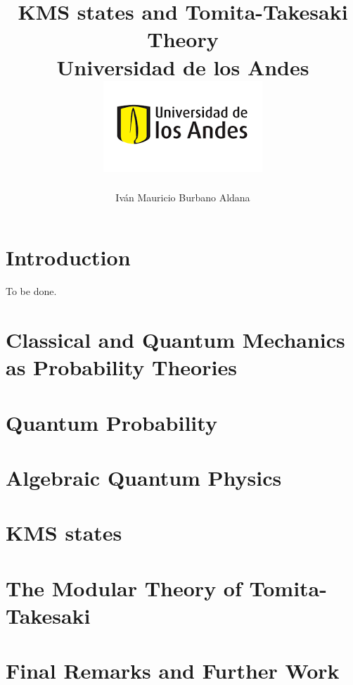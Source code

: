 \documentclass[12pt]{report}
\title 
{
	{KMS states and Tomita-Takesaki Theory}\\
	{\large Universidad de los Andes}\\
	{\includegraphics{logo.png}}	
}
\author{Iván Mauricio Burbano Aldana}
\theoremstyle{definition}
\begin{document}

\maketitle

\tableofcontents

\chapter{Introduction}
To be done.


\chapter{Classical and Quantum Mechanics as Probability Theories}


\chapter{Quantum Probability}


\chapter{Algebraic Quantum Physics}


\chapter{KMS states}


\chapter{The Modular Theory of Tomita-Takesaki}


\chapter{Final Remarks and Further Work}



\end{document}
